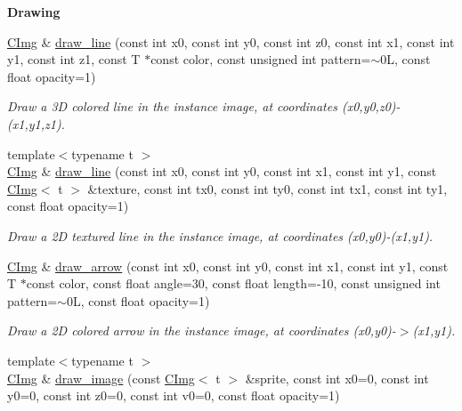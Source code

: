 \begin{Indent}{\bf Drawing}
\begin{DoxyCompactItemize}
\hyperlink{structcimg__library_1_1_c_img}{CImg} \& \hyperlink{structcimg__library_1_1_c_img_a3e9c48f8d818db301a35a81cc81daa0c}{draw\_\-line} (const int x0, const int y0, const int z0, const int x1, const int y1, const int z1, const T $\ast$const color, const unsigned int pattern=$\sim$0L, const float opacity=1)
\begin{DoxyCompactList}\small\item\em Draw a 3D colored line in the instance image, at coordinates ({\ttfamily x0},{\ttfamily y0},{\ttfamily z0})-\/({\ttfamily x1},{\ttfamily y1},{\ttfamily z1}). \item\end{DoxyCompactList}\item 
{\footnotesize template$<$typename t $>$ }\\\hyperlink{structcimg__library_1_1_c_img}{CImg} \& \hyperlink{structcimg__library_1_1_c_img_a032a349d5428b756d3151b33dbbaf31a}{draw\_\-line} (const int x0, const int y0, const int x1, const int y1, const \hyperlink{structcimg__library_1_1_c_img}{CImg}$<$ t $>$ \&texture, const int tx0, const int ty0, const int tx1, const int ty1, const float opacity=1)
\begin{DoxyCompactList}\small\item\em Draw a 2D textured line in the instance image, at coordinates ({\ttfamily x0},{\ttfamily y0})-\/({\ttfamily x1},{\ttfamily y1}). \item\end{DoxyCompactList}\item 
\hyperlink{structcimg__library_1_1_c_img}{CImg} \& \hyperlink{structcimg__library_1_1_c_img_a1824b8c07f761474db1d3006d72c8e75}{draw\_\-arrow} (const int x0, const int y0, const int x1, const int y1, const T $\ast$const color, const float angle=30, const float length=-\/10, const unsigned int pattern=$\sim$0L, const float opacity=1)
\begin{DoxyCompactList}\small\item\em Draw a 2D colored arrow in the instance image, at coordinates ({\ttfamily x0},{\ttfamily y0})-\/$>$({\ttfamily x1},{\ttfamily y1}). \item\end{DoxyCompactList}\item 
{\footnotesize template$<$typename t $>$ }\\\hyperlink{structcimg__library_1_1_c_img}{CImg} \& \hyperlink{structcimg__library_1_1_c_img_a80aa4444c73d7608b85168bba7faabe1}{draw\_\-image} (const \hyperlink{structcimg__library_1_1_c_img}{CImg}$<$ t $>$ \&sprite, const int x0=0, const int y0=0, const int z0=0, const int v0=0, const float opacity=1)

\end{DoxyCompactItemize}
\end{Indent}
